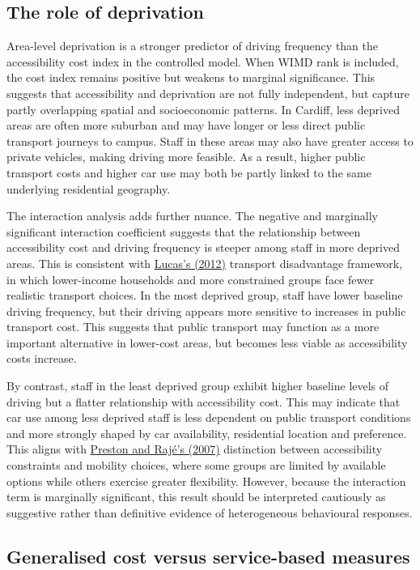 \documentclass[11pt,a4paper]{article}
\newcommand{\hcite}[2]{\hyperlink{#1}{#2}}
\newcommand{\hcite}[2]{\hyperlink{#1}{#2}}
\begin{document}
\subsection{The role of deprivation}

Area-level deprivation is a stronger predictor of driving frequency than the accessibility cost index in the controlled model. When WIMD rank is included, the cost index remains positive but weakens to marginal significance. This suggests that accessibility and deprivation are not fully independent, but capture partly overlapping spatial and socioeconomic patterns. In Cardiff, less deprived areas are often more suburban and may have longer or less direct public transport journeys to campus. Staff in these areas may also have greater access to private vehicles, making driving more feasible. As a result, higher public transport costs and higher car use may both be partly linked to the same underlying residential geography.

The interaction analysis adds further nuance. The negative and marginally significant interaction coefficient suggests that the relationship between accessibility cost and driving frequency is steeper among staff in more deprived areas. This is consistent with \hcite{lucas2012}{Lucas's (2012)} transport disadvantage framework, in which lower-income households and more constrained groups face fewer realistic transport choices. In the most deprived group, staff have lower baseline driving frequency, but their driving appears more sensitive to increases in public transport cost. This suggests that public transport may function as a more important alternative in lower-cost areas, but becomes less viable as accessibility costs increase.

By contrast, staff in the least deprived group exhibit higher baseline levels of driving but a flatter relationship with accessibility cost. This may indicate that car use among less deprived staff is less dependent on public transport conditions and more strongly shaped by car availability, residential location and preference. This aligns with \hcite{preston2007}{Preston and Rajé's (2007)} distinction between accessibility constraints and mobility choices, where some groups are limited by available options while others exercise greater flexibility. However, because the interaction term is marginally significant, this result should be interpreted cautiously as suggestive rather than definitive evidence of heterogeneous behavioural responses.

\subsection{Generalised cost versus service-based measures}
\end{document}
